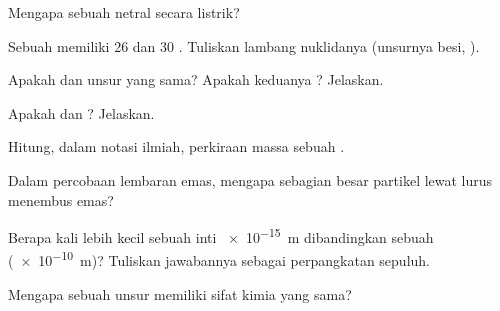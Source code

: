 \begin{exercise}[$\star$]\label{exo:g9:inside-the-atom:3}
Mengapa sebuah  netral secara listrik?
\end{exercise}

\begin{exercise}[$\star$]\label{exo:g9:inside-the-atom:4}
Sebuah  memiliki 26  dan 30 . Tuliskan lambang
nuklidanya (unsurnya besi, ).
\end{exercise}

\begin{exercise}[$\star\star$]\label{exo:g9:inside-the-atom:5}
Apakah  dan  unsur yang sama? Apakah
keduanya ? Jelaskan.
\end{exercise}

\begin{exercise}[$\star\star$]\label{exo:g9:inside-the-atom:6}
Apakah  dan  ? Jelaskan.
\end{exercise}

\begin{exercise}[$\star\star$]\label{exo:g9:inside-the-atom:7}
Hitung, dalam notasi ilmiah, perkiraan massa sebuah 
.
\end{exercise}

\begin{exercise}[$\star\star$]\label{exo:g9:inside-the-atom:8}
Dalam percobaan lembaran emas, mengapa sebagian besar partikel lewat
lurus menembus emas?
\end{exercise}

\begin{exercise}[$\star\star$]\label{exo:g9:inside-the-atom:9}
Berapa kali lebih kecil sebuah inti \qty{e-15}{m} dibandingkan sebuah
 (\qty{e-10}{m})? Tuliskan jawabannya sebagai perpangkatan
sepuluh.
\end{exercise}

\begin{exercise}[$\star\star$]\label{exo:g9:inside-the-atom:10}
Mengapa  sebuah unsur memiliki sifat kimia yang sama?
\end{exercise}

